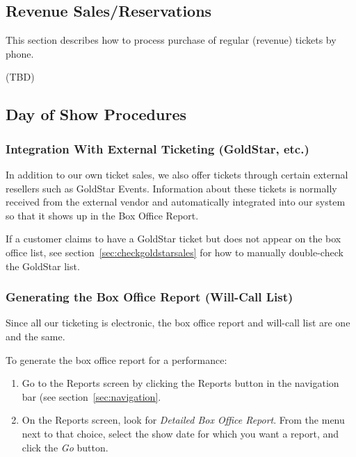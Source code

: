 \subsection{Revenue Sales/Reservations}
\label{sec:advance_sales}

This section describes how to process purchase of regular (revenue)
tickets by phone.

(TBD)

\subsection{Day of Show Procedures}
\label{sec:dayofshow}

\subsubsection{Integration With External Ticketing (GoldStar, etc.)}
\label{sec:externalticketing}

In addition to our own ticket sales, we also offer tickets through
certain external resellers such as GoldStar Events.  Information about
these tickets is normally received from the external vendor and
automatically integrated into our system so that it shows up in the Box
Office Report.

If a customer claims to have a GoldStar ticket but does not appear on
the box office list, see section~\ref{sec:checkgoldstarsales} for how to
manually double-check the GoldStar list.

\subsubsection{Generating the Box Office Report (Will-Call List)}

Since all our ticketing is electronic, the box office report and
will-call list are one and the same.

To generate the box office report for a performance:

\begin{enumerate}
\item Go to the Reports screen by clicking the Reports button in the
  navigation bar (see section~\ref{sec:navigation}.
\item On the Reports screen, look for \emph{Detailed Box Office
    Report}.  From the menu next to that choice, select the show date
  for which you want a report, and click the \emph{Go} button.
\end{enumerate}

